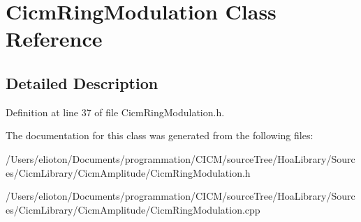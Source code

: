 \hypertarget{class_cicm_ring_modulation}{\section{Cicm\-Ring\-Modulation Class Reference}
\label{class_cicm_ring_modulation}
}


\subsection{Detailed Description}


Definition at line 37 of file Cicm\-Ring\-Modulation.\-h.



The documentation for this class was generated from the following files\-:\begin{DoxyCompactItemize}
\item 
/\-Users/elioton/\-Documents/programmation/\-C\-I\-C\-M/source\-Tree/\-Hoa\-Library/\-Sources/\-Cicm\-Library/\-Cicm\-Amplitude/Cicm\-Ring\-Modulation.\-h\item 
/\-Users/elioton/\-Documents/programmation/\-C\-I\-C\-M/source\-Tree/\-Hoa\-Library/\-Sources/\-Cicm\-Library/\-Cicm\-Amplitude/Cicm\-Ring\-Modulation.\-cpp\end{DoxyCompactItemize}
